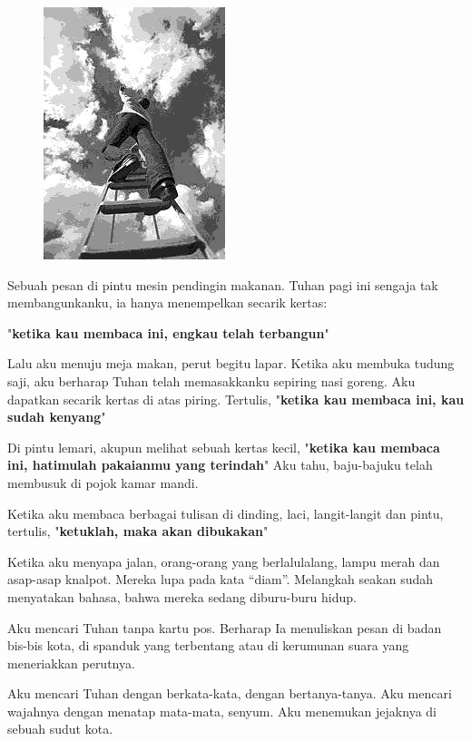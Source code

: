 
\begin{figure}
\centering
\includegraphics[scale=0.4]{gambar/aku-mencari-bw.jpg}
\end{figure}


Sebuah pesan di pintu mesin pendingin makanan. 
Tuhan pagi ini sengaja tak membangunkanku, ia hanya menempelkan secarik kertas:

"\textbf{ketika kau membaca ini, engkau telah terbangun}"


Lalu aku menuju meja makan, perut begitu lapar. Ketika aku membuka tudung saji, aku berharap Tuhan telah memasakkanku sepiring nasi goreng. Aku dapatkan secarik kertas di atas piring. Tertulis, "\textbf{ketika kau membaca ini, kau sudah kenyang}"

Di pintu lemari, akupun melihat sebuah kertas kecil, "\textbf{ketika kau membaca ini, hatimulah pakaianmu yang terindah}" Aku tahu, baju-bajuku telah membusuk di pojok kamar mandi.

Ketika aku membaca berbagai tulisan di dinding, laci, langit-langit dan pintu, tertulis, "\textbf{ketuklah, maka akan dibukakan}"

Ketika aku menyapa jalan, orang-orang yang berlalulalang, lampu merah dan asap-asap knalpot. Mereka lupa pada kata ``diam''. Melangkah seakan sudah menyatakan bahasa, bahwa mereka sedang diburu-buru hidup.

Aku mencari Tuhan tanpa kartu pos. Berharap Ia menuliskan pesan di badan bis-bis kota, di spanduk yang terbentang atau di kerumunan suara yang meneriakkan perutnya.

Aku mencari Tuhan dengan berkata-kata, dengan bertanya-tanya.
Aku mencari wajahnya dengan menatap mata-mata, senyum.
Aku menemukan jejaknya di sebuah sudut kota.

